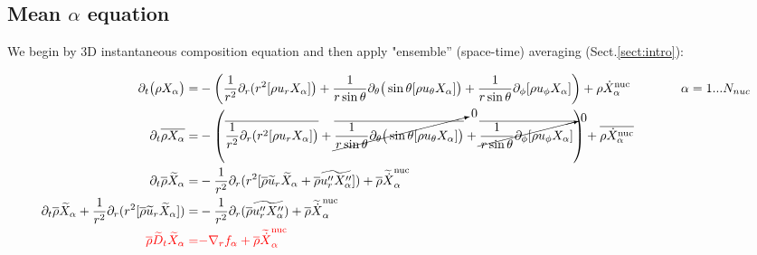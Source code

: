 \documentclass[10pt,paper=a4]{report}
\newcommand{\eht}{\overline}
\newcommand{\fht}{\widetilde}
\begin{document}
\subsection{Mean $\alpha$ equation}

We begin by 3D instantaneous composition equation and then apply "ensemble'' (space-time) averaging (Sect.\ref{sect:intro}):

\fontsize{9pt}{20pt}

\begin{align}
\partial_{t} \big(\rho X_{\alpha}\big) = & -\left( \frac{1}{r^{2}} \partial_{r}(r^{2} [\rho u_{r} X_{\alpha} ] \big) + \frac{1}{r\sin{\theta}}\partial_{\theta}\big(\sin{\theta} [\rho u_{\theta} X_{\alpha} ]\big) + \frac{1}{r \sin{\theta}} \partial_{\phi} [\rho u_{\phi} X_{\alpha}] \right) + \rho \dot{X}_{\alpha}^{\rm nuc} \ \ \ \ \ \ \ \ \ \ \ \  \alpha = 1 ... N_{nuc} \\
\partial_{t} \eht{\rho X_{\alpha}} = & -\left( \eht{\frac{1}{r^{2}} \partial_{r}(r^{2} [\rho u_{r} X_{\alpha} ] \big)} + \cancelto{0}{\eht{\frac{1}{r\sin{\theta}}\partial_{\theta}\big(\sin{\theta} [\rho u_{\theta} X_{\alpha} ]\big)}} + \cancelto{0}{\eht{\frac{1}{r \sin{\theta}} \partial_{\phi} [\rho u_{\phi} X_{\alpha}]}} \right) + \eht{\rho \dot{X}_{\alpha}^{\rm nuc}} \\
\partial_{t} \eht{\rho} \fht{X}_{\alpha} = & -\frac{1}{r^{2}} \partial_{r} ( r^{2} [\eht{\rho} \fht{u}_{r} \fht{X}_{\alpha} + \eht{\rho}\fht{u''_r X''_\alpha} ] ) + \eht{\rho} \fht{\dot{X}}_{\alpha}^{\rm nuc} \\
\partial_{t} \eht{\rho} \fht{X}_{\alpha} +\frac{1}{r^{2}} \partial_{r} ( r^{2} [\eht{\rho} \fht{u}_{r} \fht{X}_{\alpha}] ) = & -\frac{1}{r^{2}} \partial_{r} (\eht{\rho}\fht{u''_r X''_\alpha}) + \eht{\rho} \fht{\dot{X}}_{\alpha}^{\rm nuc} \\
{\color{red} \eht{\rho}\fht{D}_t \fht{X}_\alpha = }& {\color{red} -\nabla_r f_\alpha + \eht{\rho} \fht{\dot{X}}_{\alpha}^{\rm nuc}}
\end{align}

\fontsize{12pt}{20pt}
\end{document}
